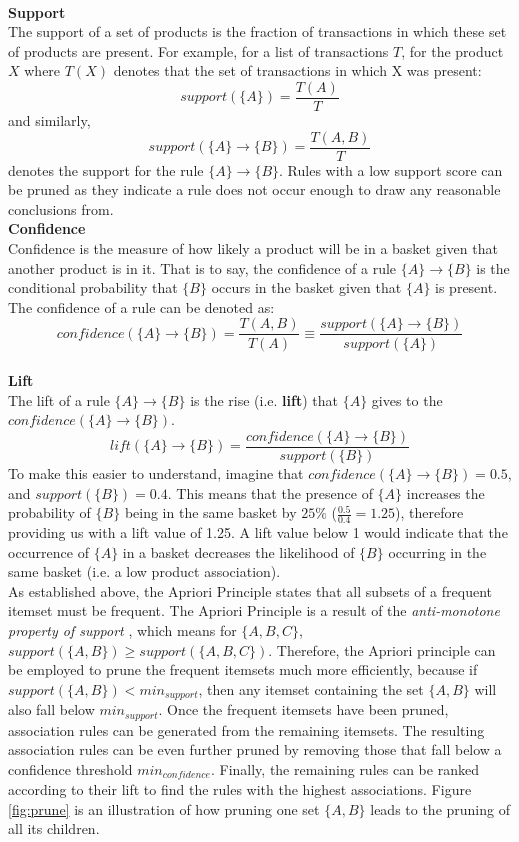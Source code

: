 \documentclass[a4paper,11pt]{article}
\newcommand{\setA}{\{A\}}
\newcommand{\setB}{\{B\}}
\newcommand{\abrule}{\setA\rightarrow\setB}
\begin{document}
\\\textbf{Support}\\
The support of a set of products is the fraction of transactions in which these set of products are present. For example,  for a list of transactions $T$, for the product $X$ where $T(X)$ denotes that the set of transactions in which X was present:
\[
\textit{support}(\{A\}) = \frac{T(A)}{T}
\]
and similarly, 
\[
\textit{support}(\abrule) = \frac{T(A,B)}{T}
\]
denotes the support for the rule $\abrule$. Rules with a low support score can be pruned as they indicate a rule does not occur enough to draw any reasonable conclusions from.
\\\textbf{Confidence}\\
Confidence is the measure of how likely a product will be in a basket given that another product is in it. That is to say,  the confidence of a rule $\abrule$ is the conditional probability that $\setB$ occurs in the basket given that $\setA$ is present. The confidence of a rule can be denoted as:
\[
\textit{confidence}(\abrule) = \frac{T(A, B)}{T(A)} \equiv \frac{\textit{support}(\abrule)}{\textit{support}(\setA)}
\]
\\\textbf{Lift}\\
The lift of a rule $\abrule$ is the rise (i.e. \textbf{lift}) that $\setA$ gives to the $\textit{confidence}(\abrule)$.
\[
\textit{lift}(\abrule) = \frac{confidence(\abrule)}{support(\setB)}
\]
To make this easier to understand, imagine that $\textit{confidence}(\abrule)=0.5$, and $\textit{support}(\setB)=0.4.$ This means that the presence of $\setA$ increases the probability of $\setB$ being in the same basket by $25\%$ ($\frac{0.5}{0.4}=1.25$), therefore providing us with a lift value of 1.25.  A lift value below 1 would indicate that the occurrence of $\setA$ in a basket decreases the likelihood of $\setB$ occurring in the same basket (i.e. a low product association).
\\
As established above,  the Apriori Principle states that all subsets of a frequent itemset must be frequent.  The Apriori Principle is a result of the \textit{anti-monotone property of support} \cite{anti_monotone}, which means for $\{A,B,C\}$, $\textit{support}(\{A,B\}) \geq \textit{support}(\{A,B,C\})$.  Therefore, the Apriori principle can be employed to prune the frequent itemsets much more efficiently, because if $support(\{A,B\}) < \textit{min}_{\textit{support}}$, then any itemset containing the set $\{A,B\}$ will also fall below $\textit{min}_{\textit{support}}$. Once the frequent itemsets have been pruned,  association rules can be generated from the remaining itemsets.  The resulting association rules can be even further pruned by removing those that fall below a confidence threshold $\textit{min}_{\textit{confidence}}$.  Finally, the remaining rules can be ranked according to their  lift to find the rules with the highest associations.  Figure \ref{fig:prune} is an illustration of how pruning one set $\{A, B\}$ leads to the pruning of all its children.
\end{document}

